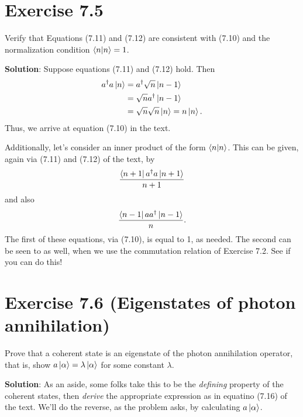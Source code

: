 \documentclass{book}
\begin{document}
\section*{Exercise 7.5}
    Verify that Equations (7.11) and (7.12) are consistent with (7.10) and the normalization condition $\bra{n}\ket{n} = 1$.

    \textbf{Solution}: Suppose equations (7.11) and (7.12) hold. Then
    \begin{align}
    \begin{aligned}
        a^\dagger a \ket{n} &= a^\dagger \sqrt{n}\ket{n-1} \\
        &= \sqrt{n} a^\dagger \ket{n-1} \\
        &= \sqrt{n} \sqrt{n} \ket{n} = n \ket{n}.
    \end{aligned}
    \end{align}
    Thus, we arrive at equation (7.10) in the text.
    
    Additionally, let's consider an inner product of the form $\bra{n}\ket{n}$. This can be given, again via (7.11) and (7.12) of the text, by
    \begin{align}
        \frac{\bra{n+1}a^\dagger a \ket{n+1}}{n+1}
    \end{align}
    and also 
    \begin{align}
        \frac{\bra{n-1}a a^\dagger \ket{n-1}}{n}.
    \end{align}
    The first of these equations, via (7.10), is equal to 1, as needed. The second can be seen to as well, when we use the commutation relation of Exercise 7.2. See if you can do this!

\section*{Exercise 7.6 (Eigenstates of photon annihilation)}
    Prove that a coherent state is an eigenstate of the photon annihilation operator, that is, show $a\ket{\alpha} = \lambda \ket{\alpha}$ for some constant $\lambda$.

    \textbf{Solution}: As an aside, some folks take this to be the \emph{defining} property of the coherent states, then \emph{derive} the appropriate expression as in equatino (7.16) of the text. We'll do the reverse, as the problem asks, by calculating $a\ket{\alpha}$.
\end{document}
